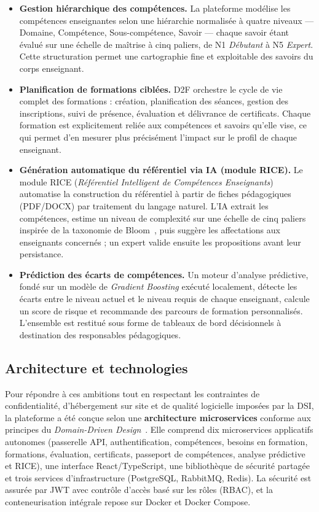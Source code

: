 \documentclass[12pt,a4paper]{report}
\begin{document}
\begin{itemize}[leftmargin=1.2cm]
  \item \textbf{Gestion hiérarchique des compétences.}
  La plateforme modélise les compétences enseignantes selon une hiérarchie
  normalisée à quatre niveaux — Domaine, Compétence, Sous-compétence, Savoir —
  chaque savoir étant évalué sur une échelle de maîtrise à cinq paliers, de N1
  \textit{Débutant} à N5 \textit{Expert}. Cette structuration permet une
  cartographie fine et exploitable des savoirs du corps enseignant.

  \item \textbf{Planification de formations ciblées.}
  D2F orchestre le cycle de vie complet des formations : création, planification
  des séances, gestion des inscriptions, suivi de présence, évaluation et
  délivrance de certificats. Chaque formation est explicitement reliée aux
  compétences et savoirs qu'elle vise, ce qui permet d'en mesurer plus
  précisément l'impact sur le profil de chaque enseignant.

  \item \textbf{Génération automatique du référentiel via IA (module RICE).}
  Le module RICE (\textit{Référentiel Intelligent de Compétences Enseignants})
  automatise la construction du référentiel à partir de fiches pédagogiques
  (PDF/DOCX) par traitement du langage naturel. L'IA extrait les compétences,
  estime un niveau de complexité sur une échelle de cinq paliers inspirée de la
  taxonomie de Bloom~\cite{bloom1956taxonomy}, puis suggère les affectations aux
  enseignants concernés ; un expert valide ensuite les propositions avant leur
  persistance.

  \item \textbf{Prédiction des écarts de compétences.}
  Un moteur d'analyse prédictive, fondé sur un modèle de \textit{Gradient
  Boosting} exécuté localement, détecte les écarts entre le niveau actuel et le
  niveau requis de chaque enseignant, calcule un score de risque et recommande
  des parcours de formation personnalisés. L'ensemble est restitué sous forme de
  tableaux de bord décisionnels à destination des responsables pédagogiques.
\end{itemize}

\subsection{Architecture et technologies}

Pour répondre à ces ambitions tout en respectant les contraintes de
confidentialité, d'hébergement sur site et de qualité logicielle imposées par la
DSI, la plateforme a été conçue selon une \textbf{architecture microservices}
conforme aux principes du \textit{Domain-Driven Design}~\cite{evans2003ddd}.
Elle comprend dix microservices applicatifs autonomes (passerelle API,
authentification, compétences, besoins en formation, formations, évaluation,
certificats, passeport de compétences, analyse prédictive et RICE), une interface
React/TypeScript, une bibliothèque de sécurité partagée et trois services
d'infrastructure (PostgreSQL, RabbitMQ, Redis). La sécurité est assurée par JWT
avec contrôle d'accès basé sur les rôles (RBAC), et la conteneurisation intégrale
repose sur Docker et Docker Compose.
\end{document}
